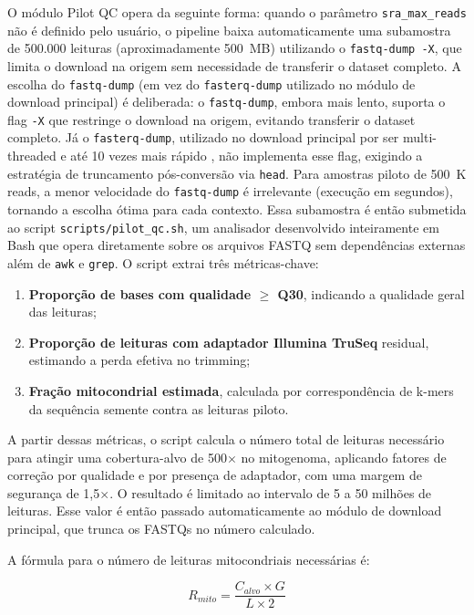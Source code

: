 O módulo Pilot QC opera da seguinte forma: quando o parâmetro \texttt{sra\_max\_reads} não é definido pelo usuário, o pipeline baixa automaticamente uma subamostra de 500.000 leituras (aproximadamente 500~MB) utilizando o \texttt{fastq-dump -X}, que limita o download na origem sem necessidade de transferir o dataset completo. A escolha do \texttt{fastq-dump} (em vez do \texttt{fasterq-dump} utilizado no módulo de download principal) é deliberada: o \texttt{fastq-dump}, embora mais lento, suporta o flag \texttt{-X} que restringe o download na origem, evitando transferir o dataset completo. Já o \texttt{fasterq-dump}, utilizado no download principal por ser multi-threaded e até 10 vezes mais rápido \cite{ncbi2023}, não implementa esse flag, exigindo a estratégia de truncamento pós-conversão via \texttt{head}. Para amostras piloto de 500~K reads, a menor velocidade do \texttt{fastq-dump} é irrelevante (execução em segundos), tornando a escolha ótima para cada contexto. Essa subamostra é então submetida ao script \texttt{scripts/pilot\_qc.sh}, um analisador desenvolvido inteiramente em Bash que opera diretamente sobre os arquivos FASTQ sem dependências externas além de \texttt{awk} e \texttt{grep}. O script extrai três métricas-chave:

\begin{enumerate}
    \item \textbf{Proporção de bases com qualidade $\geq$ Q30}, indicando a qualidade geral das leituras;
    \item \textbf{Proporção de leituras com adaptador Illumina TruSeq} residual, estimando a perda efetiva no trimming;
    \item \textbf{Fração mitocondrial estimada}, calculada por correspondência de k-mers da sequência semente contra as leituras piloto.
\end{enumerate}

A partir dessas métricas, o script calcula o número total de leituras necessário para atingir uma cobertura-alvo de 500$\times$ no mitogenoma, aplicando fatores de correção por qualidade e por presença de adaptador, com uma margem de segurança de 1,5$\times$. O resultado é limitado ao intervalo de 5 a 50 milhões de leituras. Esse valor é então passado automaticamente ao módulo de download principal, que trunca os FASTQs no número calculado.

A fórmula para o número de leituras mitocondriais necessárias é:

\begin{equation}
R_{mito} = \frac{C_{alvo} \times G}{L \times 2}
\label{eq:rmito}
\end{equation}

